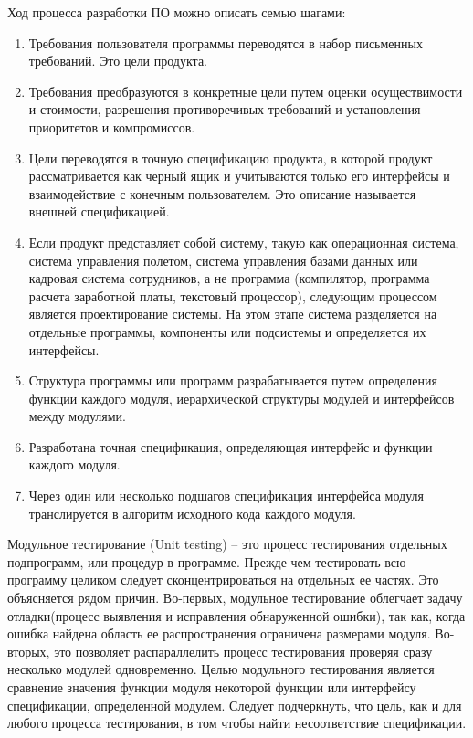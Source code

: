 Ход процесса разработки ПО можно описать семью шагами:
\begin{enumerate}
    \item Требования пользователя программы переводятся в набор письменных требований. Это цели продукта.
    \item Требования преобразуются в конкретные цели путем оценки осуществимости и стоимости, разрешения противоречивых требований и установления приоритетов и компромиссов.
    \item Цели переводятся в точную спецификацию продукта, в которой продукт рассматривается как черный ящик и учитываются только его интерфейсы и взаимодействие с конечным пользователем. Это описание называется внешней спецификацией.
    \item Если продукт представляет собой систему, такую как операционная система, система управления полетом, система управления базами данных или кадровая система сотрудников, а не программа (компилятор, программа расчета заработной платы, текстовый процессор), следующим процессом является проектирование системы. На этом этапе система разделяется на отдельные программы, компоненты или подсистемы и определяется их интерфейсы.
    \item Структура программы или программ разрабатывается путем определения функции каждого модуля, иерархической структуры модулей и интерфейсов между модулями.
    \item Разработана точная спецификация, определяющая интерфейс и функции каждого модуля.
    \item Через один или несколько подшагов спецификация интерфейса модуля транслируется в алгоритм исходного кода каждого модуля.
\end{enumerate}
Модульное тестирование (Unit testing) -- это процесс тестирования отдельных подпрограмм, или 
процедур в программе. Прежде чем тестировать всю программу целиком следует сконцентрироваться 
на отдельных ее частях. Это объясняется рядом причин. Во-первых, модульное тестирование облегчает задачу
отладки(процесс выявления и исправления обнаруженной ошибки), так как, когда ошибка найдена 
область ее распространения ограничена размерами модуля. Во-вторых, это позволяет распараллелить 
процесс тестирования проверяя сразу несколько модулей одновременно. Целью модульного тестирования
является сравнение значения функции модуля некоторой функции или интерфейсу спецификации, 
определенной модулем. Следует подчеркнуть, что цель, как и для любого процесса тестирования, в том
чтобы найти несоответствие спецификации. 


